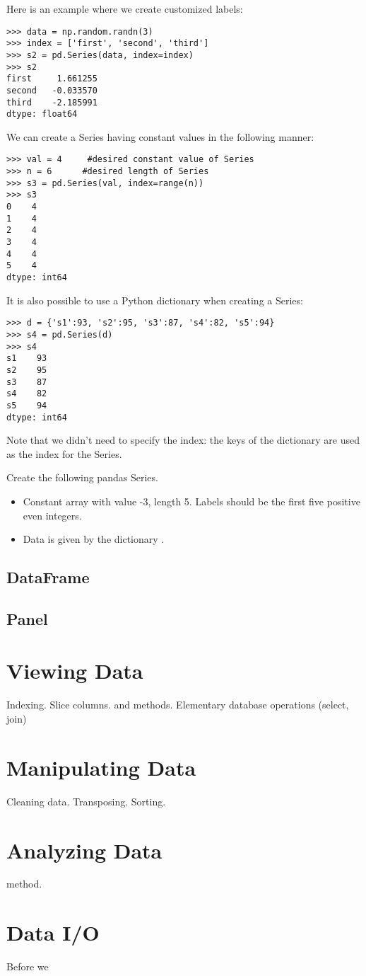 Here is an example where we create customized labels:
\begin{lstlisting}
>>> data = np.random.randn(3)
>>> index = ['first', 'second', 'third']
>>> s2 = pd.Series(data, index=index)
>>> s2
first     1.661255
second   -0.033570
third    -2.185991
dtype: float64
\end{lstlisting}

We can create a Series having constant values in the following manner:
\begin{lstlisting}
>>> val = 4     #desired constant value of Series
>>> n = 6      #desired length of Series
>>> s3 = pd.Series(val, index=range(n))
>>> s3
0    4
1    4
2    4
3    4
4    4
5    4
dtype: int64
\end{lstlisting}

It is also possible to use a Python dictionary when creating a Series:
\begin{lstlisting}
>>> d = {'s1':93, 's2':95, 's3':87, 's4':82, 's5':94}
>>> s4 = pd.Series(d)
>>> s4
s1    93
s2    95
s3    87
s4    82
s5    94
dtype: int64
\end{lstlisting}
Note that we didn't need to specify the index: the keys of the dictionary are used as the index for the Series. 

\begin{problem}
Create the following pandas Series.

\begin{itemize}
\item Constant array with value -3, length 5. Labels should be the first five positive even integers.

\item Data is given by the dictionary .
\end{itemize}
\end{problem}


\subsection*{DataFrame}

\subsection*{Panel}

\section*{Viewing Data}
Indexing.
Slice columns.
 and  methods.
Elementary database operations (select, join)

\section*{Manipulating Data}
Cleaning data. Transposing. Sorting.

\section*{Analyzing Data}
 method.

\section*{Data I/O}
Before we
